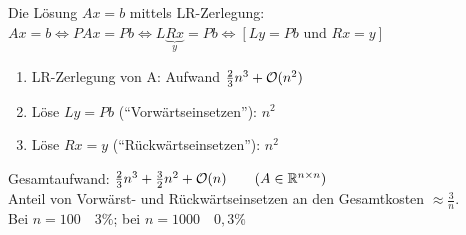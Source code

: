 Die Lösung $Ax=b$ mittels LR-Zerlegung:\\
$Ax = b \Leftrightarrow PAx = Pb \Leftrightarrow L\underbrace{Rx}_{y} = Pb \Leftrightarrow [Ly = Pb \text{ und } Rx = y]$
\begin{enumerate}
  \item LR-Zerlegung von A: Aufwand $\frac{2}{3} n^3 + \mathcal{O}(n^2)$
  \item Löse $Ly = Pb$ (``Vorwärtseinsetzen''): $n^2$
  \item Löse $Rx = y$ (``Rückwärtseinsetzen''): $n^2$
\end{enumerate}
Gesamtaufwand: $\frac{2}{3} n^3 + \frac{3}{2} n^2 + \mathcal{O}(n) \qquad (A \in \mathbb{R}^{n \times n})$\\
Anteil von Vorwärst- und Rückwärtseinsetzen an den Gesamtkosten $\approx \frac{3}{n}$.\\
Bei $n=100 \quad 3\%$; bei $n=1000 \quad 0,3\%$

